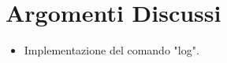 \section{Argomenti Discussi}
	\begin{itemize}
		\item Implementazione del comando "log".
	\end{itemize}